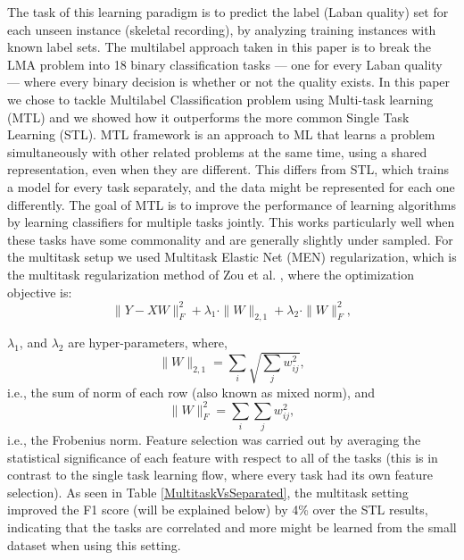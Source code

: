 \documentclass[11pt,twocolumn,varwidth=true,a4paper,fleqn]{sigchi}
\begin{document}
The task of this learning paradigm is to predict
the label (Laban quality) set for each unseen instance (skeletal recording), 
by analyzing training instances with known label sets. The multilabel
approach taken in this paper is to break the LMA problem into 18
binary classification tasks --- one for every Laban quality --- where every binary
decision is whether or not the quality exists. 
In this paper we chose to tackle Multilabel Classification problem using
Multi-task learning (MTL) and we showed how it outperforms the more common
Single Task Learning (STL).
MTL framework \cite{caruana1997multitask} is an approach to ML that learns a problem simultaneously with other related problems at the same time, using a shared representation, even when they are different. This differs from STL, which trains a model for every task separately, and the data might be represented for each one differently.
The goal of MTL is to improve the performance of learning algorithms by learning classifiers for multiple tasks jointly. This works particularly well when these tasks have some commonality and are generally slightly under sampled.
For the multitask setup we used Multitask Elastic Net (MEN) regularization, which is the multitask regularization method of Zou et al. \cite{Zou}, where the optimization objective is:
\\
\begin{equation}\label{eq:MEN}
\|Y - XW\|^2_F+\lambda_1\cdot\|W\|_{2,1}+\lambda_2\cdot\|W\|^2_F,
\end{equation}

$\lambda_1$, and $\lambda_2$ are hyper-parameters, where,
\\
\begin{equation*}
\|W\|_{2,1} = \sum_i \sqrt{\sum_j w_{ij}^2},
\end{equation*}
i.e., the sum of norm of each row (also known as mixed norm), and
\begin{equation*}
\|W\|^2_F = \sum_i{\sum_j w_{ij}^2},
\end{equation*}
i.e., the Frobenius norm.
Feature selection was carried out by averaging the statistical significance of
each feature with respect to all of the tasks (this is in contrast to the single
task learning flow, where every task had its own feature selection). As seen in
Table \ref{MultitaskVsSeparated}, the multitask setting improved the F1 score (will be explained below) by 4\% over the STL results, indicating that the tasks are correlated and more might be learned from the small dataset when using this setting.
\end{document}
